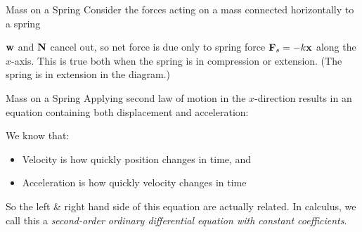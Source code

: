 \documentclass[12pt,compress,aspectratio=169]{beamer}
\newcommand{\mb}[1]{\ensuremath\mathbf{#1}}
\newcommand{\eq}[2]{\vspace{#1}{\Large\begin{displaymath}#2\end{displaymath}}}
\begin{document}
\begin{frame}{Mass on a Spring}
  Consider the forces acting on a mass connected horizontally to a spring

  \begin{center}
  \end{center}

  \vspace{-.1in}$\mb{w}$ and $\mb{N}$ cancel out, so net force is due only to
  spring force $\mb{F}_s=-k\mb{x}$ along the $x$-axis. This is true both when
  the spring is in compression or extension. (The spring is in extension in the
  diagram.)
\end{frame}



\begin{frame}{Mass on a Spring}
  Applying second law of motion in the $x$-direction results in an equation
  containing both displacement and acceleration:

  \eq{-.2in}{
    \sum F=F_s=ma\quad\rightarrow\quad-\frac{k}{m}x=a
  }

  We know that:
  \begin{itemize}
  \item Velocity is how quickly position changes in time, and
  \item Acceleration is how quickly velocity changes in time
  \end{itemize}
  So the left \& right hand side of this equation are actually related. In
  calculus, we call this a
  \emph{second-order ordinary differential equation with constant coefficients}.
\end{frame}
\end{document}
